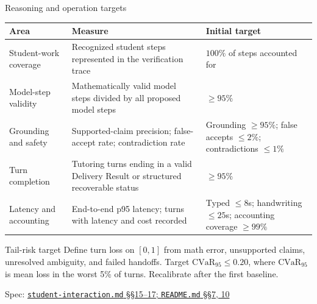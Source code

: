 \documentclass[aspectratio=169,10pt]{beamer}
\newcommand{\specnote}[2]{%
  \vfill\hfill{\tiny\color{Muted}Spec: \href{run:../../specs/#1}{\texttt{#1} #2}}}
\begin{document}
\begin{frame}{Reasoning and operation targets}
\footnotesize
\begin{tabularx}{\textwidth}{@{}P{.24\textwidth}Y P{.25\textwidth}@{}}
\toprule
\textbf{Area} & \textbf{Measure} & \textbf{Initial target} \\
\midrule
Student-work coverage & Recognized student steps represented in the verification trace & $100\%$ of steps accounted for \\
Model-step validity & Mathematically valid model steps divided by all proposed model steps & $\geq95\%$ \\
Grounding and safety & Supported-claim precision; false-accept rate; contradiction rate & Grounding $\geq95\%$; false accepts $\leq2\%$; contradictions $\leq1\%$ \\
Turn completion & Tutoring turns ending in a valid Delivery Result or structured recoverable status & $\geq95\%$ \\
Latency and accounting & End-to-end p95 latency; turns with latency and cost recorded & Typed $\leq8$s; handwriting $\leq25$s; accounting coverage $\geq99\%$ \\
\bottomrule
\end{tabularx}
\vspace{.2em}
\begin{block}{Tail-risk target}
Define turn loss on $[0,1]$ from math error, unsupported claims, unresolved ambiguity, and failed handoffs. Target $\mathrm{CVaR}_{95}\leq0.20$, where $\mathrm{CVaR}_{95}$ is mean loss in the worst 5\% of turns. Recalibrate after the first baseline.
\end{block}
\specnote{student-interaction.md}{\S\S15--17; \texttt{README.md} \S\S7, 10}
\end{frame}
\end{document}
